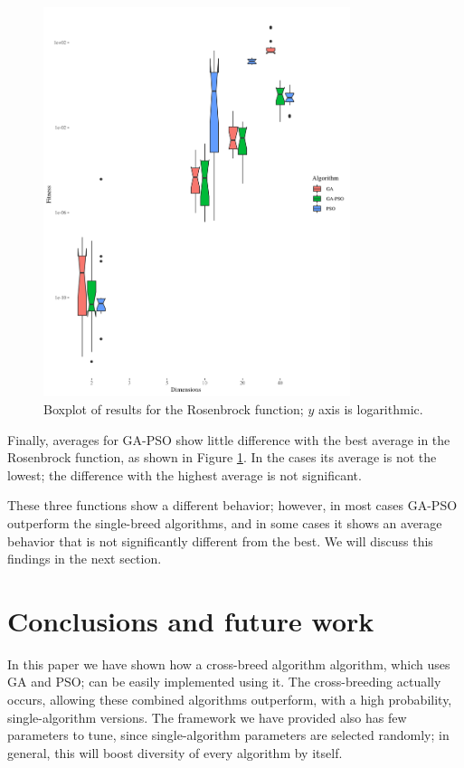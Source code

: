 \documentclass[runningheads]{llncs}
\begin{document}
\begin{figure}[h!tbp]
  \centering
  \includegraphics[width=0.8\textwidth]{img/rosenbrock-boxplot.png}
  \caption{Boxplot of results for the Rosenbrock function; $y$ axis is logarithmic.\label{fig:boxplot:rosenbrock}}
\end{figure}
%

Finally, averages for GA-PSO show little difference with the best
average in the Rosenbrock function, as shown in Figure
\ref{fig:boxplot:rosenbrock}. In the cases its average is not the
lowest; the difference with the highest average is not significant.

These three functions show a different behavior; however, in most
cases GA-PSO outperform the single-breed algorithms, and in some cases
it shows an average behavior that is not significantly different from
the best. We will discuss this findings in the next section.

\section{Conclusions and future work}

In this paper we have shown how a cross-breed algorithm algorithm,
which uses GA and PSO; can be easily implemented using it. The
cross-breeding actually occurs, allowing these combined algorithms
outperform, with a high probability, single-algorithm
versions. The framework we have provided also has few parameters to
tune, since single-algorithm parameters are selected randomly; in
general, this will boost diversity of every algorithm by itself. 
\end{document}
